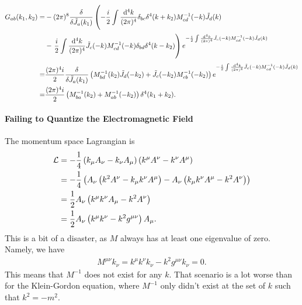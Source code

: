 \begin{align*}
	G_{ab}(k_{1}, k_{2}) =& -(2\pi)^{8}\fdv{\tilde{J}_{a}(k_{1})}\left(-\frac{i}{2}\inte{}{}\frac{\dd[4]{k}}{(2\pi)^{4}}\delta_{bc}\delta^{4}(k + k_{2})M_{cd}^{-1}(-k)\tilde{J}_{d}(k) \right. \\
	&- \left. \frac{i}{2}\inte{}{}\frac{\dd[4]{k}}{(2\pi)^{4}}\tilde{J}_{c}(-k)M_{cd}^{-1}(-k)\delta_{bd}\delta^{4}(k - k_{2})\right)e^{-\frac{i}{2}\inte{}{}\frac{\dd[4]{k}}{(2\pi)^{4}}\tilde{J}_{c}(-k)M_{cd}^{-1}(-k)\tilde{J}_{d}(k)} \\
	=& \frac{(2\pi)^{4}i}{2}\fdv{\tilde{J}_{a}(k_{1})}\left(M_{bd}^{-1}(k_{2})\tilde{J}_{d}(-k_{2}) + \tilde{J}_{c}(-k_{2})M_{cb}^{-1}(-k_{2})\right)e^{-\frac{i}{2}\inte{}{}\frac{\dd[4]{k}}{(2\pi)^{4}}\tilde{J}_{c}(-k)M_{cd}^{-1}(-k)\tilde{J}_{d}(k)} \\
	=& \frac{(2\pi)^{4}i}{2}\left(M_{ba}^{-1}(k_{2}) + M_{ab}^{-1}(-k_{2})\right)\delta^{4}(k_{1} + k_{2}).
\end{align*}

\paragraph{Failing to Quantize the Electromagnetic Field}
The momentum space Lagrangian is
\begin{align*}
	\mathcal{L} &= -\frac{1}{4}\left(k_{\mu}A_{\nu} - k_{\nu}A_{\mu}\right)\left(k^{\mu}A^{\nu} - k^{\nu}A^{\mu}\right) \\
	     &= -\frac{1}{4}\left(A_{\nu}\left(k^{2}A^{\nu} - k_{\mu}k^{\nu}A^{\mu}\right) - A_{\nu}\left(k_{\mu}k^{\nu}A^{\mu} - k^{2}A^{\nu}\right)\right) \\
	     &= \frac{1}{2}A_{\nu}\left(k^{\mu}k^{\nu}A_{\mu} - k^{2}A^{\nu}\right) \\
	     &= \frac{1}{2}A_{\nu}\left(k^{\mu}k^{\nu} - k^{2}g^{\mu\nu}\right)A_{\mu}.
\end{align*}
This is a bit of a disaster, as $M$ always has at least one eigenvalue of zero. Namely, we have
\begin{align*}
	M^{\mu\nu}k_{\nu} = k^{\mu}k^{\nu}k_{\nu} - k^{2}g^{\mu\nu}k_{\nu} = 0.
\end{align*}
This means that $M^{-1}$ does not exist for any $k$. That scenario is a lot worse than for the Klein-Gordon equation, where $M^{-1}$ only didn't exist at the set of $k$ such that $k^{2} = -m^{2}$.

